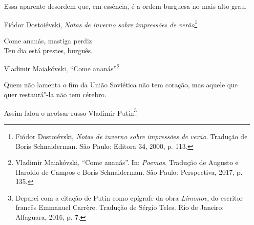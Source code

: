 \chapter*{}

\vspace*{\fill}

\thispagestyle{empty}

\epigraph{Essa aparente desordem que, em essência, é a ordem burguesa no mais alto grau.}{Fiódor Dostoiévski, \emph{Notas de inverno sobre impressões de verão}\footnote{Fiódor Dostoiévski, \emph{Notas de inverno sobre impressões de verão}. Tradução de Boris Schnaiderman. São Paulo: Editora 34, 2000, p. 113.}}

\epigraph{Come ananás, mastiga perdiz\\ Teu dia está prestes, burguês.}{Vladimir Maiakóvski, ``Come ananás''\footnote{Vladimir Maiakóvski, ``Come ananás''. In: \emph{Poemas}. Tradução de Augusto e Haroldo de Campos e Boris Schnaiderman. São Paulo: Perspectiva, 2017, p. 135.}}

\epigraph{Quem não lamenta o fim da União Soviética não tem coração, mas aquele que quer restaurá"-la não tem cérebro.}{Assim falou o neotsar russo Vladimir Putin\footnote{Deparei com a citação de Putin como epígrafe da obra \emph{Limonov}, do escritor francês Emmanuel Carrère. Tradução de Sérgio Teles. Rio de Janeiro: Alfaguara, 2016, p. 7.}}